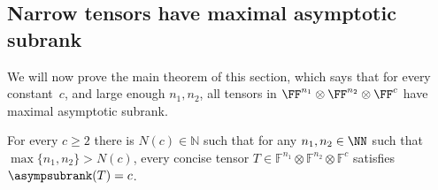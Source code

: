 %
%
%
%

%

%
    
%




%
%
    
%
%
    
%
    
%
%
%
%
%
%
%
%
%
%
%
%

%
%
%
%

%
%
%

%
    
%
%
%
%
%
%
%
%
%
%
%
%
%
%

%
%
%
%


\subsection{Narrow tensors have maximal asymptotic subrank}
\label{sec:narrow}\label{subsec:main-unb}



%

%


%
We will now %
%
prove the main theorem of this section, which says that for every constant~$c$, and large enough $n_1, n_2$, all tensors in $\FF^{n_1} \otimes \FF^{n_2} \otimes \FF^{c}$ have maximal asymptotic subrank.

\begin{theorem}%
\label{theorem:concise-cn1n2-assubrank-c}
    For every $c\geq2$ there is $N(c)\in\mathbb{N}$ such that for any $n_1,n_2\in\NN$ such that $\max\{n_1,n_2\}>N(c)$, every concise tensor $T\in\mathbb{F}^{n_1}\otimes\mathbb{F}^{n_2}\otimes\mathbb{F}^c$ satisfies $\asympsubrank(T)=c$.
\end{theorem}






%


